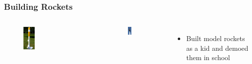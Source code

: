 \documentclass[aspectratio=169]{beamer}
\begin{document}
\begin{frame}
  \frametitle{Building Rockets}
  \begin{columns}[c]
    \begin{figure}
      \includegraphics[width=0.2\textwidth]{1996_eggspress_zps43246419.jpg}
    \end{figure}

    \begin{figure}
      \includegraphics[width=0.2\textwidth]{SR71.jpeg}
    \end{figure}
    
    \begin{itemize}
    \item Built model rockets as a kid and demoed them in school
    \end{itemize}
  \end{columns}
\end{frame}
\end{document}
